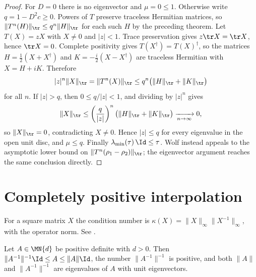 \begin{proof}\leanok
    For $D=0$ there is no eigenvector and $\mu=0\le1$. Otherwise write
    $q=1-D^2c\ge0$. Powers of $T$ preserve traceless Hermitian matrices,
    so $\lVert T^n(H)\rVert_{\tr}\le q^n\lVert H\rVert_{\tr}$ for each such
    $H$ by the preceding theorem. Let $T(X)=zX$ with $X\ne0$ and $|z|<1$.
    Trace preservation gives $z\tr X=\tr X$, hence $\tr X=0$. Complete
    positivity gives $T(X^\dagger)=T(X)^\dagger$, so the matrices
    $H=\tfrac12(X+X^\dagger)$ and $K=-\tfrac{i}{2}(X-X^\dagger)$ are traceless
    Hermitian with $X=H+iK$. Therefore
    \begin{align}
        |z|^n\lVert X\rVert_{\tr}=\lVert T^n(X)\rVert_{\tr}
        \le q^n\bigl(\lVert H\rVert_{\tr}+\lVert K\rVert_{\tr}\bigr)
    \end{align}
    for all $n$. If $|z|>q$, then $0\le q/|z|<1$, and dividing by $|z|^n$
    gives
    \begin{align}
        \lVert X\rVert_{\tr}\le\left(\frac{q}{|z|}\right)^n
            \bigl(\lVert H\rVert_{\tr}+\lVert K\rVert_{\tr}\bigr)
        \xrightarrow[n\to\infty]{}0,
    \end{align}
    so $\lVert X\rVert_{\tr}=0$, contradicting $X\ne0$. Hence $|z|\le q$ for every
    eigenvalue in the open unit disc, and $\mu\le q$. Finally
    $\lambda_{\min}(\tau)\,\Id\le\tau$. Wolf instead appeals to the asymptotic
    lower bound on $\lVert T^n(\rho_1-\rho_2)\rVert_{\tr}$; the eigenvector
    argument reaches the same conclusion directly.
\end{proof}

\section{Completely positive interpolation}

\begin{definition}
    \label{def:condition_number}
    \leanok
    For a square matrix $X$ the condition number is
    $\kappa(X)=\lVert X\rVert_\infty\lVert X^{-1}\rVert_\infty$, with the
    operator norm. See \cite[Chapter~8]{Wolf2012Quantum}.
\end{definition}

\begin{lemma}
    \label{lem:pos_def_extremal_eigenvalues}
    \leanok
    Let $A\in\MN{d}$ be positive definite with $d>0$. Then
    $\lVert A^{-1}\rVert^{-1}\Id\le A\le\lVert A\rVert\Id$, the number
    $\lVert A^{-1}\rVert^{-1}$ is positive, and both $\lVert A\rVert$ and
    $\lVert A^{-1}\rVert^{-1}$ are eigenvalues of $A$ with unit eigenvectors.
\end{lemma}

